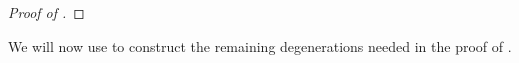 \documentclass[12pt]{amsart}
\newcommand{\mb}{\mathbb}
\newcommand{\mc}{\mathcal}
\theoremstyle{plain}
\theoremstyle{definition}
\newtheorem{Def}{Definition}[section]
\theoremstyle{remark}
\begin{document}
\begin{proof}[Proof of ]

\end{proof}

We will now use  to construct the remaining degenerations needed in the proof of .
\end{document}
